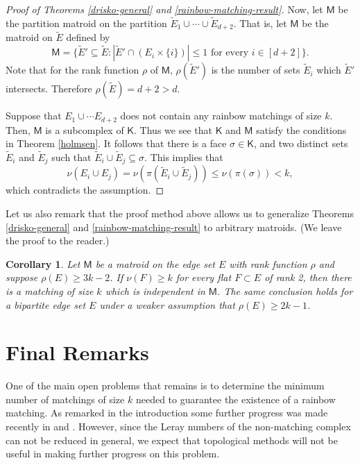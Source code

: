 \documentclass[10pt]{amsart}
\newtheorem{cor}[thm]{Corollary}
\theoremstyle{definition}
\begin{document}
\begin{proof}[Proof of Theorems \ref{drisko-general} and \ref{rainbow-matching-result}]
		Now, let $\mathsf{M}$ be the partition matroid on the partition $\tilde{E}_1 \cup \cdots \cup \tilde{E}_{d+2}$. That is, let $\mathsf{M}$ be the matroid on $\tilde{E}$ defined by
		\[\mathsf{M}=\{\tilde{E}'\subseteq \tilde{E}: |\tilde{E}'\cap (E_i\times \{i\})|\leq 1 \textrm{ for every $i\in [d+2]$}\}.\] 
		Note that for the rank function $\rho$ of $\mathsf{M}$, $\rho(\tilde{E}')$ is the number of sets $\tilde{E}_i$ which $\tilde{E}'$ intersects. Therefore $\rho(\tilde{E})=d+2>d$.
		
		Suppose that $E_1\cup \cdots E_{d+2}$ does not contain any
		rainbow matchings of size $k$. Then, $\mathsf{M}$ is a subcomplex of $\mathsf{K}$. Thus we see that $\mathsf{K}$ and $\mathsf{M}$ satisfy the conditions in Theorem \ref{holmsen}. It follows that there is a face $\sigma \in \mathsf{K}$, and two distinct sets $\tilde{E}_i$ and $\tilde{E}_j$ such that $\tilde{E}_i\cup \tilde{E}_j \subseteq \sigma$. This implies that
		$$ \nu(E_i\cup E_j)=\nu(\pi(\tilde{E}_i\cup \tilde{E}_j))\leq \nu(\pi(\sigma))<k,$$
		which contradicts the assumption.\end{proof}
	
	Let us also remark that the proof method above allows us to generalize Theorems \ref{drisko-general} and \ref{rainbow-matching-result} to arbitrary matroids. (We leave the proof to the reader.)
	
	\begin{cor}
		Let $\mathsf{M}$ be a matroid on the edge set $E$ with rank function $\rho$ and suppose $\rho(E)\geq 3k-2$. If $\nu(F)\geq k$ for every flat $F\subset E$ of rank 2, then there is a matching of size $k$ which is independent in $\mathsf{M}$. 
		The same conclusion holds for a bipartite edge set $E$ under a weaker assumption that $\rho(E)\geq 2k-1$.
	\end{cor}
	
	\section{Final Remarks} \label{finals}
	
	One of the main open problems that remains is to determine the minimum number of matchings of size $k$ needed to guarantee the existence of a rainbow matching. As remarked in the introduction some further progress was made recently in \cite{rainbow_matching_general_improvement} and \cite{collaborative_bipartite}. However, since the Leray numbers of the non-matching complex can not be reduced in general, we expect that topological methods will not be useful in making further progress on this problem. 
	
\end{document}
